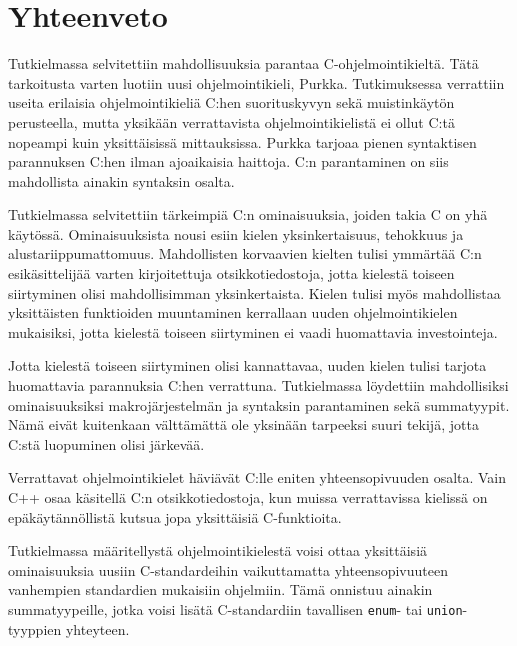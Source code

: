\section{Yhteenveto}

Tutkielmassa selvitettiin mahdollisuuksia parantaa C-ohjelmointikieltä. Tätä
tarkoitusta varten luotiin uusi ohjelmointikieli, Purkka. Tutkimuksessa
verrattiin useita erilaisia ohjelmointikieliä C:hen suorituskyvyn sekä
muistinkäytön perusteella, mutta yksikään verrattavista ohjelmointikielistä ei
ollut C:tä nopeampi kuin yksittäisissä mittauksissa. Purkka tarjoaa pienen
syntaktisen parannuksen C:hen ilman ajoaikaisia haittoja. C:n parantaminen on
siis mahdollista ainakin syntaksin osalta.

Tutkielmassa selvitettiin tärkeimpiä C:n ominaisuuksia, joiden takia C on yhä
käytössä. Ominaisuuksista nousi esiin kielen yksinkertaisuus, tehokkuus
ja alustariippumattomuus. Mahdollisten korvaavien kielten tulisi ymmärtää
C:n esikäsittelijää varten kirjoitettuja otsikkotiedostoja, jotta kielestä
toiseen siirtyminen olisi mahdollisimman yksinkertaista. Kielen tulisi myös
mahdollistaa yksittäisten funktioiden muuntaminen kerrallaan uuden
ohjelmointikielen mukaisiksi, jotta kielestä toiseen siirtyminen ei vaadi
huomattavia investointeja.

Jotta kielestä toiseen siirtyminen olisi kannattavaa, uuden kielen tulisi
tarjota huomattavia parannuksia C:hen verrattuna. Tutkielmassa löydettiin
mahdollisiksi ominaisuuksiksi makrojärjestelmän ja syntaksin parantaminen sekä
summatyypit. Nämä eivät kuitenkaan välttämättä ole yksinään tarpeeksi suuri
tekijä, jotta C:stä luopuminen olisi järkevää.

Verrattavat ohjelmointikielet häviävät C:lle eniten yhteensopivuuden osalta.
Vain C++ osaa käsitellä C:n otsikkotiedostoja, kun muissa verrattavissa
kielissä on epäkäytännöllistä kutsua jopa yksittäisiä C-funktioita.

Tutkielmassa määritellystä ohjelmointikielestä voisi ottaa yksittäisiä
ominaisuuksia uusiin C-standardeihin vaikuttamatta yhteensopivuuteen vanhempien
standardien mukaisiin ohjelmiin. Tämä onnistuu ainakin summatyypeille, jotka
voisi lisätä C-standardiin tavallisen \texttt{enum}- tai
\texttt{union}-tyyppien yhteyteen.
